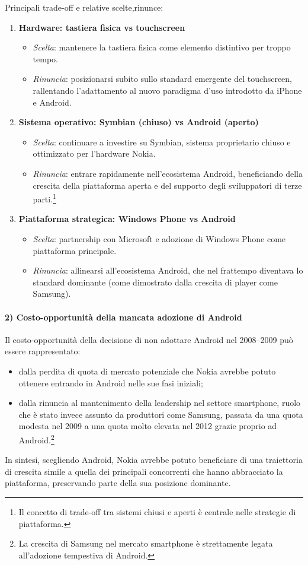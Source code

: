 \documentclass[a4paper,12pt]{article}
\begin{document}
	Principali trade-off e relative scelte,rinunce:
	\begin{enumerate}
		\item \textbf{Hardware: tastiera fisica vs touchscreen}
		\begin{itemize}
			\item \emph{Scelta}: mantenere la tastiera fisica come elemento distintivo per troppo tempo.
			\item \emph{Rinuncia}: posizionarsi subito sullo standard emergente del touchscreen, rallentando l'adattamento al nuovo paradigma d'uso introdotto da iPhone e Android.
		\end{itemize}
		\item \textbf{Sistema operativo: Symbian (chiuso) vs Android (aperto)}
		\begin{itemize}
			\item \emph{Scelta}: continuare a investire su Symbian, sistema proprietario chiuso e ottimizzato per l'hardware Nokia.
			\item \emph{Rinuncia}: entrare rapidamente nell'ecosistema Android, beneficiando della crescita della piattaforma aperta e del supporto degli sviluppatori di terze parti.\footnote{Il concetto di trade-off tra sistemi chiusi e aperti è centrale nelle strategie di piattaforma.}
		\end{itemize}
		\item \textbf{Piattaforma strategica: Windows Phone vs Android}
		\begin{itemize}
			\item \emph{Scelta}: partnership con Microsoft e adozione di Windows Phone come piattaforma principale.
			\item \emph{Rinuncia}: allinearsi all'ecosistema Android, che nel frattempo diventava lo standard dominante (come dimostrato dalla crescita di player come Samsung).%
		\end{itemize}
	\end{enumerate}
	
	\paragraph{2) Costo-opportunità della mancata adozione di Android}
	
	Il costo-opportunità della decisione di non adottare Android nel 2008–2009 può essere rappresentato:
	\begin{itemize}
		\item dalla perdita di quota di mercato potenziale che Nokia avrebbe potuto ottenere entrando in Android nelle sue fasi iniziali;
		\item dalla rinuncia al mantenimento della leadership nel settore smartphone, ruolo che è stato invece assunto da produttori come Samsung, passata da una quota modesta nel 2009 a una quota molto elevata nel 2012 grazie proprio ad Android.\footnote{La crescita di Samsung nel mercato smartphone è strettamente legata all'adozione tempestiva di Android. }
	\end{itemize}
	In sintesi, scegliendo Android, Nokia avrebbe potuto beneficiare di una traiettoria di crescita simile a quella dei principali concorrenti che hanno abbracciato la piattaforma, preservando parte della sua posizione dominante.
	
\end{document}
